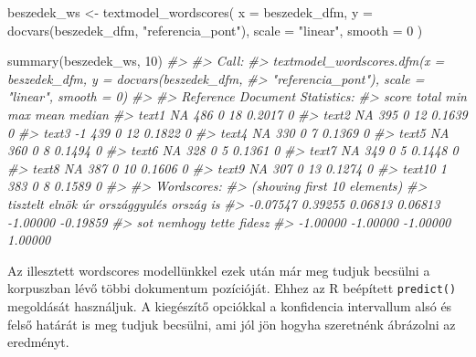 \documentclass[
]{book}
\newenvironment{Shaded}{\begin{snugshade}}{\end{snugshade}}
\newcommand{\AttributeTok}[1]{\textcolor[rgb]{0.77,0.63,0.00}{#1}}
\newcommand{\CommentTok}[1]{\textcolor[rgb]{0.56,0.35,0.01}{\textit{#1}}}
\newcommand{\DecValTok}[1]{\textcolor[rgb]{0.00,0.00,0.81}{#1}}
\newcommand{\FunctionTok}[1]{\textcolor[rgb]{0.00,0.00,0.00}{#1}}
\newcommand{\NormalTok}[1]{#1}
\newcommand{\OtherTok}[1]{\textcolor[rgb]{0.56,0.35,0.01}{#1}}
\newcommand{\StringTok}[1]{\textcolor[rgb]{0.31,0.60,0.02}{#1}}
\begin{document}
\begin{Shaded}
\begin{Highlighting}[]
\NormalTok{beszedek\_ws }\OtherTok{\textless{}{-}} \FunctionTok{textmodel\_wordscores}\NormalTok{(}
  \AttributeTok{x =}\NormalTok{ beszedek\_dfm,}
  \AttributeTok{y =} \FunctionTok{docvars}\NormalTok{(beszedek\_dfm, }\StringTok{"referencia\_pont"}\NormalTok{),}
  \AttributeTok{scale =} \StringTok{"linear"}\NormalTok{,}
  \AttributeTok{smooth =} \DecValTok{0}
\NormalTok{)}

\FunctionTok{summary}\NormalTok{(beszedek\_ws, }\DecValTok{10}\NormalTok{)}
\CommentTok{\#\textgreater{} }
\CommentTok{\#\textgreater{} Call:}
\CommentTok{\#\textgreater{} textmodel\_wordscores.dfm(x = beszedek\_dfm, y = docvars(beszedek\_dfm, }
\CommentTok{\#\textgreater{}     "referencia\_pont"), scale = "linear", smooth = 0)}
\CommentTok{\#\textgreater{} }
\CommentTok{\#\textgreater{} Reference Document Statistics:}
\CommentTok{\#\textgreater{}        score total min max   mean median}
\CommentTok{\#\textgreater{} text1     NA   486   0  18 0.2017      0}
\CommentTok{\#\textgreater{} text2     NA   395   0  12 0.1639      0}
\CommentTok{\#\textgreater{} text3     {-}1   439   0  12 0.1822      0}
\CommentTok{\#\textgreater{} text4     NA   330   0   7 0.1369      0}
\CommentTok{\#\textgreater{} text5     NA   360   0   8 0.1494      0}
\CommentTok{\#\textgreater{} text6     NA   328   0   5 0.1361      0}
\CommentTok{\#\textgreater{} text7     NA   349   0   5 0.1448      0}
\CommentTok{\#\textgreater{} text8     NA   387   0  10 0.1606      0}
\CommentTok{\#\textgreater{} text9     NA   307   0  13 0.1274      0}
\CommentTok{\#\textgreater{} text10     1   383   0   8 0.1589      0}
\CommentTok{\#\textgreater{} }
\CommentTok{\#\textgreater{} Wordscores:}
\CommentTok{\#\textgreater{} (showing first 10 elements)}
\CommentTok{\#\textgreater{}     tisztelt        elnök           úr országgyulés       ország           is }
\CommentTok{\#\textgreater{}     {-}0.07547      0.39255      0.06813      0.06813     {-}1.00000     {-}0.19859 }
\CommentTok{\#\textgreater{}          sot      nemhogy        tette       fidesz }
\CommentTok{\#\textgreater{}     {-}1.00000     {-}1.00000     {-}1.00000      1.00000}
\end{Highlighting}
\end{Shaded}

Az illesztett wordscores modellünkkel ezek után már meg tudjuk becsülni
a korpuszban lévő többi dokumentum pozícióját. Ehhez az R beépített
\texttt{predict()} megoldását használjuk. A kiegészítő opciókkal a
konfidencia intervallum alsó és felső határát is meg tudjuk becsülni,
ami jól jön hogyha szeretnénk ábrázolni az eredményt.
\end{document}
